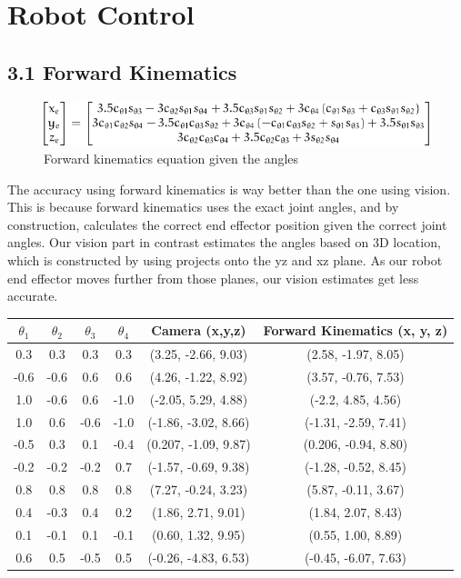 \section{Robot Control}


\subsection{3.1 Forward Kinematics}

\begin{figure}[ht]
\includegraphics[]{x_y_z.png}
\caption{Forward kinematics equation given the angles}
\end{figure}
The accuracy using forward kinematics is way better than the one using vision. This is because forward kinematics uses the exact joint angles, and by construction, calculates the correct end effector position given the correct joint angles. Our vision part in contrast estimates the angles based on 3D location, which is constructed by using projects onto the yz and xz plane. As our robot end effector moves further from those planes, our vision estimates get less accurate.
\begin{center}
\begin{tabular}{|c|c|c|c|c|c|}
\hline
$\theta_1 $ & $ \theta_2 $ & $ \theta_3 $ & $ \theta_4 $ & Camera (x,y,z) & Forward Kinematics (x, y, z) \\\hline
 0.3 & 0.3 & 0.3 & 0.3 & (3.25, -2.66, 9.03) & (2.58, -1.97, 8.05) \\ \hline
 -0.6 & -0.6 & 0.6 & 0.6 & (4.26, -1.22, 8.92) & (3.57, -0.76, 7.53) \\ \hline
 1.0 & -0.6 & 0.6 & -1.0 & (-2.05, 5.29, 4.88) & (-2.2, 4.85, 4.56) \\ \hline
 1.0 & 0.6 & -0.6 & -1.0 & (-1.86, -3.02, 8.66) & (-1.31, -2.59, 7.41) \\ \hline
 -0.5 & 0.3 & 0.1 & -0.4 & (0.207, -1.09, 9.87) & (0.206, -0.94, 8.80) \\ \hline
 -0.2 & -0.2 & -0.2 & 0.7 & (-1.57, -0.69, 9.38) & (-1.28, -0.52, 8.45) \\ \hline
 0.8 & 0.8 & 0.8 & 0.8 & (7.27, -0.24, 3.23) & (5.87, -0.11, 3.67) \\ \hline
 0.4 & -0.3 & 0.4 & 0.2 & (1.86, 2.71, 9.01) & (1.84, 2.07, 8.43) \\ \hline
 0.1 & -0.1 & 0.1 & -0.1 & (0.60, 1.32, 9.95) & (0.55, 1.00, 8.89) \\ \hline
 0.6 & 0.5 & -0.5 & 0.5 & (-0.26, -4.83, 6.53) & (-0.45, -6.07, 7.63) \\ \hline
\end{tabular}
\end{center}
